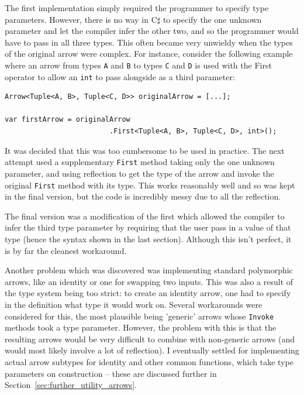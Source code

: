 \documentclass[12pt,twoside,notitlepage]{report}
\begin{document}
The first implementation simply required the programmer to specify type parameters. However, there is no way in C$\sharp$ to specify the one unknown parameter and let the compiler infer the other two, and so the programmer would have to pass in all three types. This often became very unwieldy when the types of the original arrow were complex. For instance, consider the following example where an arrow from types \texttt{A} and \texttt{B} to types \texttt{C} and \texttt{D} is used with the First operator to allow an \texttt{int} to pass alongside as a third parameter:

\begin{lstlisting}[language={[Sharp]C}]
Arrow<Tuple<A, B>, Tuple<C, D>> originalArrow = [...];

var firstArrow = originalArrow
                         .First<Tuple<A, B>, Tuple<C, D>, int>();
\end{lstlisting}

It was decided that this was too cumbersome to be used in practice. The next attempt used a supplementary \texttt{First} method taking only the one unknown parameter, and using reflection to get the type of the arrow and invoke the original \texttt{First} method with its type. This works reasonably well and so was kept in the final version, but the code is incredibly messy due to all the reflection.

The final version was a modification of the first which allowed the compiler to infer the third type parameter by requiring that the user pass in a value of that type (hence the syntax shown in the last section). Although this isn't perfect, it is by far the cleanest workaround.

Another problem which was discovered was implementing standard polymorphic arrows, like an identity or one for swapping two inputs. This was also a result of the type system being too strict: to create an identity arrow, one had to specify in the definition what type it would work on. Several workarounds were considered for this, the most plausible being 'generic' arrows whose \texttt{Invoke} methods took a type parameter. However, the problem with this is that the resulting arrows would be very difficult to combine with non-generic arrows (and would most likely involve a lot of reflection). I eventually settled for implementing actual arrow subtypes for identity and other common functions, which take type parameters on construction -- these are discussed further in Section~\ref{sec:further_utility_arrows}.
\end{document}
